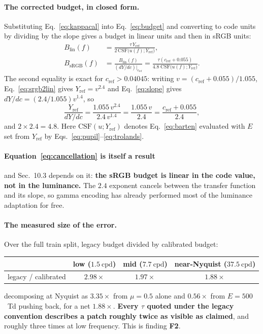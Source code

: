 \documentclass[11pt,a4paper]{article}
\newcommand{\cpd}{\mathrm{cpd}}
\begin{document}
\paragraph{The corrected budget, in closed form.}
Substituting Eq.~\eqref{eq:kappacal} into Eq.~\eqref{eq:budget} and
converting to code units by dividing by the slope gives a budget in linear
units and then in sRGB units:
\begin{align}
  B_{\mathrm{lin}}(f)
    &= \frac{\tau\,Y_{\mathrm{ref}}}
            {2\,\mathrm{CSF}\big(u(f);Y_{\mathrm{ref}}\big)},
    \label{eq:budgetlin}\\[3pt]
  B_{\mathrm{sRGB}}(f)
    &= \frac{B_{\mathrm{lin}}(f)}{(dY/dc)|_{c_{\mathrm{ref}}}}
     = \frac{\tau\left(c_{\mathrm{ref}}+0.055\right)}
            {4.8\;\mathrm{CSF}\big(u(f);Y_{\mathrm{ref}}\big)} .
  \label{eq:budgetsrgb}
\end{align}
The second equality is exact for $c_{\mathrm{ref}}>0.04045$: writing
$v=(c_{\mathrm{ref}}+0.055)/1.055$, Eq.~\eqref{eq:srgb2lin} gives
$Y_{\mathrm{ref}}=v^{2.4}$ and Eq.~\eqref{eq:slope} gives
$dY/dc=(2.4/1.055)v^{1.4}$, so
\begin{equation}
  \frac{Y_{\mathrm{ref}}}{dY/dc}
  = \frac{1.055\,v^{2.4}}{2.4\,v^{1.4}}
  = \frac{1.055\,v}{2.4}
  = \frac{c_{\mathrm{ref}}+0.055}{2.4},
  \label{eq:cancellation}
\end{equation}
and $2\times2.4=4.8$. Here $\mathrm{CSF}(u;Y_{\mathrm{ref}})$ denotes
Eq.~\eqref{eq:barten} evaluated with $E$ set from $Y_{\mathrm{ref}}$ by
Eqs.~\eqref{eq:pupil}--\eqref{eq:trolands}.

\paragraph{Equation~\eqref{eq:cancellation} is itself a result} and Sec.~10.3
depends on it: \textbf{the sRGB budget is linear in the code value, not in
the luminance.} The $2.4$ exponent cancels between the transfer function and
its slope, so gamma encoding has already performed most of the luminance
adaptation for free.

\paragraph{The measured size of the error.}
Over the full train split, legacy budget divided by calibrated budget:
\begin{center}
\begin{tabular}{@{}lccc@{}}
\toprule
 & low ($1.5\ \cpd$) & mid ($7.7\ \cpd$) & near-Nyquist ($37.5\ \cpd$) \\
\midrule
legacy / calibrated & $2.98\times$ & $1.97\times$ & $1.88\times$ \\
\bottomrule
\end{tabular}
\end{center}
decomposing at Nyquist as $3.35\times$ from $\mu=0.5$ alone and $0.56\times$
from $E=500$~Td pushing back, for a net $1.88\times$. \textbf{Every $\tau$
quoted under the legacy convention describes a patch roughly twice as
visible as claimed}, and roughly three times at low frequency. This is
finding \textbf{F2}.
\end{document}
